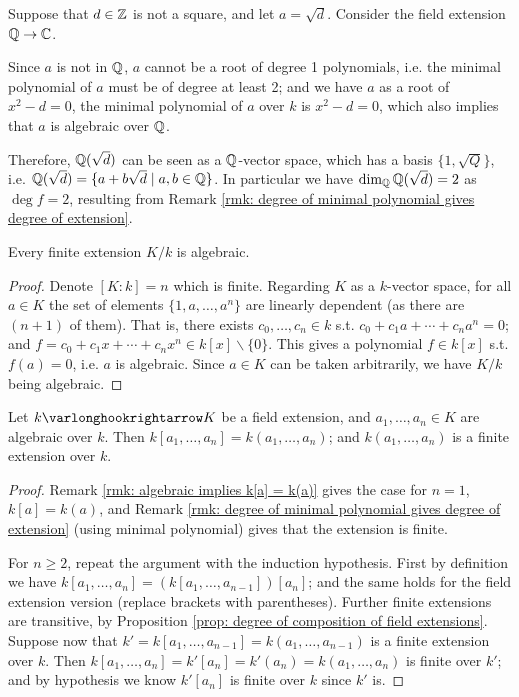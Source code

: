 \documentclass{article}
\begin{document}
\begin{example}
    Suppose that $d \in \mathbb{Z}$ is not a square, and let $a = \sqrt{d}$. Consider the field extension $\mathbb{Q} \to \mathbb{C}$.
    
    Since $a$ is not in $\mathbb{Q}$, $a$ cannot be a root of degree 1 polynomials, i.e. the minimal polynomial of $a$ must be of degree at least 2; and we have $a$ as a root of $x^2 - d = 0$, the minimal polynomial of $a$ over $k$ is $x^2 - d = 0$, which also implies that $a$ is algebraic over $\mathbb{Q}$.

    Therefore, $\mathbb{Q}(\sqrt{d})$ can be seen as a $\mathbb{Q}$-vector space, which has a basis $\{1, \sqrt{Q}\}$, i.e. $\mathbb{Q}(\sqrt{d}) = \{ a + b \sqrt{d} \mid a, b \in \mathbb{Q} \}$. In particular we have $\dim_{\mathbb{Q}} \mathbb{Q}(\sqrt{d}) = 2$ as $\deg f = 2$, resulting from Remark \ref{rmk: degree of minimal polynomial gives degree of extension}.
\end{example}

\begin{proposition}\label{prop: finite extensions are algebraic}
    Every finite extension $K/k$ is algebraic. 
\end{proposition}

\begin{proof}
    Denote $[K : k] = n$ which is finite. Regarding $K$ as a $k$-vector space, for all $a \in K$ the set of elements $\{ 1, a, \dots, a^n \}$ are linearly dependent (as there are $(n+1)$ of them). That is, there exists $c_0, \dots, c_n \in k$ s.t. $c_0 + c_1 a + \cdots + c_n a^n = 0$; and $f = c_0 + c_1 x + \cdots + c_n x^n \in k[x] \smallsetminus \{0\}$. This gives a polynomial $f \in k[x]$ s.t. $f(a) = 0$, i.e. $a$ is algebraic. Since $a \in K$ can be taken arbitrarily, we have $K/k$ being algebraic. 
\end{proof}

\begin{proposition}\label{prop: finitely generated algebraic extensions are finite}
    Let $k \ext K$ be a field extension, and $a_1, \dots, a_n \in K$ are algebraic over $k$. Then $k[a_1, \dots, a_n] = k(a_1, \dots, a_n)$; and $k(a_1, \dots, a_n)$ is a finite extension over $k$. 
\end{proposition}

\begin{proof}
    Remark \ref{rmk: algebraic implies k[a] = k(a)} gives the case for $n = 1$, $k[a] = k(a)$, and Remark \ref{rmk: degree of minimal polynomial gives degree of extension} (using minimal polynomial) gives that the extension is finite. 

    For $n \geq 2$, repeat the argument with the induction hypothesis. First by definition we have $k[a_1, \dots, a_n] = (k[a_1, \dots, a_{n-1}]) [a_n]$; and the same holds for the field extension version (replace brackets with parentheses). Further finite extensions are transitive, by Proposition \ref{prop: degree of composition of field extensions}. Suppose now that $k' = k[a_1, \dots, a_{n-1}] = k(a_1, \dots, a_{n-1})$ is a finite extension over $k$. Then $k[a_1, \dots, a_n] = k'[a_n] = k'(a_n) = k(a_1, \dots, a_n)$ is finite over $k'$; and by hypothesis we know $k'[a_n]$ is finite over $k$ since $k'$ is. 
\end{proof}
\end{document}
